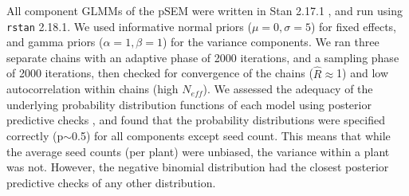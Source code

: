\documentclass[12pt]{article} %
\begin{document}

All component GLMMs of the pSEM were written in Stan 2.17.1 \citep{gelman2015}, and run using \texttt{rstan} 2.18.1.
We used informative normal priors ($\mu=0, \sigma=5$) for fixed effects, and gamma priors ($\alpha=1, \beta=1$) for the variance components.
We ran three separate chains with an adaptive phase of 2000 iterations, and a sampling phase of 2000 iterations, then checked for convergence of the chains ($\hat{R} \approx$1) and low autocorrelation within chains (high $N_{eff}$).
We assessed the adequacy of the underlying probability distribution functions of each model using posterior predictive checks \citep{gelman2013}, and found that the probability distributions were specified correctly (p$\sim$0.5) for all components except seed count.
This means that while the average seed counts (per plant) were unbiased, the variance within a plant was not. 
However, the negative binomial distribution had the closest posterior predictive checks of any other distribution. 
\end{document}
